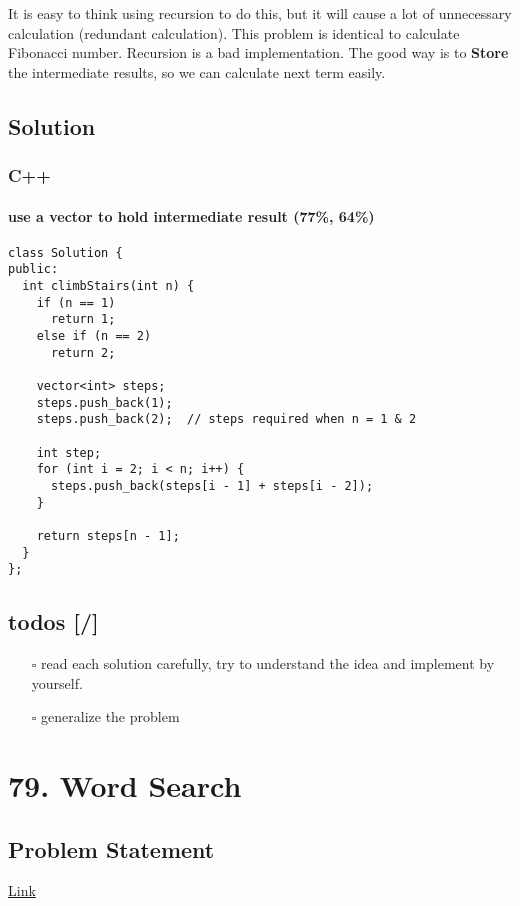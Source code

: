 \documentclass[12pt]{article}
\begin{document}
It is easy to think using recursion to do this, but it will cause a lot of unnecessary calculation (redundant calculation). This problem is identical to calculate Fibonacci number. Recursion is a bad implementation. The good way is to \textbf{Store} the intermediate results, so we can calculate next term easily.

\subsection{Solution}
\label{sec:orga25b615}
\subsubsection{C++}
\label{sec:org4c4d0ff}
\paragraph{use a vector to hold intermediate result (77\%, 64\%)}
\label{sec:org5ecd53a}
\begin{verbatim}
class Solution {
public:
  int climbStairs(int n) {
    if (n == 1)
      return 1;
    else if (n == 2)
      return 2;

    vector<int> steps;
    steps.push_back(1);
    steps.push_back(2);  // steps required when n = 1 & 2

    int step;
    for (int i = 2; i < n; i++) {
      steps.push_back(steps[i - 1] + steps[i - 2]);
    }

    return steps[n - 1];
  }
};
\end{verbatim}

\subsection{todos [/]}
\label{sec:org3d7a21d}
\begin{itemize}
\item[{$\square$}] read each solution carefully, try to understand the idea and implement by yourself.
\item[{$\square$}] generalize the problem
\end{itemize}

\section{79. Word Search}
\label{sec:orga6f22a6}
\subsection{Problem Statement}
\label{sec:org1fb96d7}
\href{https://leetcode.com/problems/word-search/}{Link}
\end{document}
